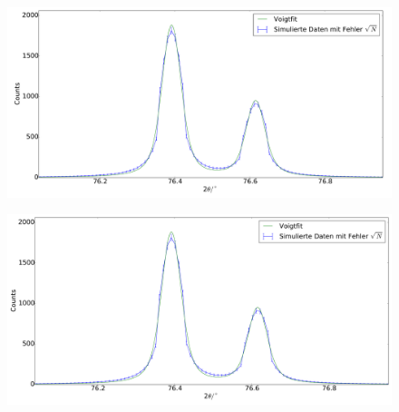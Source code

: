 \begin{figure}[H]
\begin{minipage}{.5\textwidth}
  \centering
  \includegraphics[scale=0.15]{Simulation_Siliciumpulver_5}
  \label{fig:pul_sim_sil_5}
\end{minipage}
\hspace{0.5cm}
\begin{minipage}{.5\textwidth}
  \centering
  \includegraphics[scale=0.15]{Simulation_Siliciumpulver_6}
  \label{fig:pul_sim_sil_6}
\end{minipage}
\end{figure}
